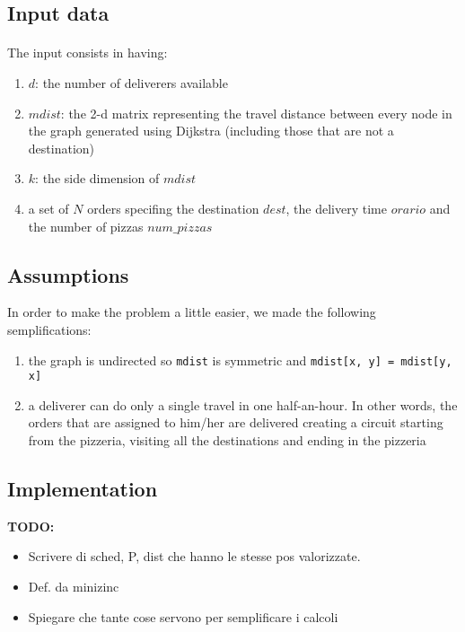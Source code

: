 \documentclass[10pt]{article}
\begin{document}
	\subsection{Input data}

	\paragraph*{}
	The input consists in having:
	\begin{enumerate}
		\item $d$: the number of deliverers available
		\item $mdist$: the 2-d matrix representing the travel distance between
			every node in the graph generated using Dijkstra (including those
			that are not a destination)
		\item $k$: the side dimension of $mdist$
		\item a set of $N$ orders specifing the destination $dest$, the delivery 
			time $orario$ and the number of pizzas $num\_pizzas$
	\end{enumerate}

	\subsection{Assumptions}
	In order to make the problem a little easier, we made the following 
	semplifications:
	\begin{enumerate}
		\item the graph is undirected so \texttt{mdist}	is symmetric and 
			\texttt{mdist[x, y] = mdist[y, x]}
		\item a deliverer can do only a single travel in one half-an-hour. In other
			words, the orders that are assigned to him/her are delivered creating 
			a circuit starting from the pizzeria, visiting all the destinations 
			and ending in the pizzeria
	\end{enumerate}

	\subsection{Implementation}


	\textbf{TODO:} 
	\begin{itemize}
		\item Scrivere di sched, P, dist che hanno le stesse pos valorizzate.
		\item Def. da minizinc
		\item Spiegare che tante cose servono per semplificare i calcoli
	\end{itemize}
	
\end{document}
